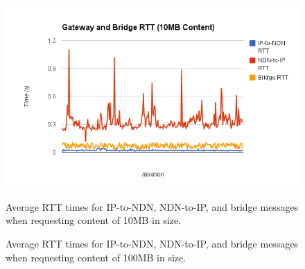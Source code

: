 \begin{figure}
\begin{center}
\includegraphics[scale=0.7]{./images/large.png}
\label{fig:perf2}
\caption{Average RTT times for IP-to-NDN, NDN-to-IP, and bridge messages when requesting content of 10MB in size.}
\end{center}
\end{figure}

\begin{figure}
\begin{center}
\label{fig:perf2}
\caption{Average RTT times for IP-to-NDN, NDN-to-IP, and bridge messages when requesting content of 100MB in size.}
\end{center}
\end{figure}



